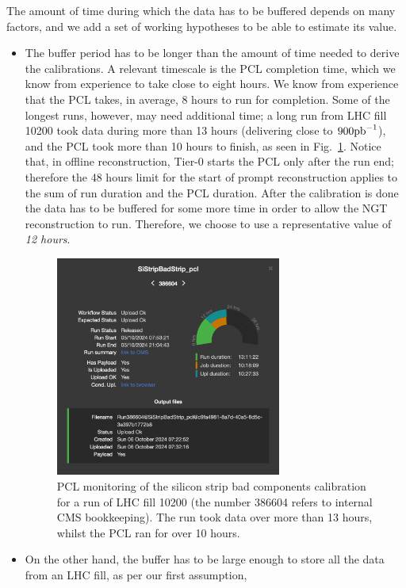 The amount of time during which the data has to be buffered depends on many factors,
and we add a set of working hypotheses to be able to estimate its value.
\begin{itemize}
\item The buffer period has to be longer than the amount of time needed to derive the calibrations.
A relevant timescale is the PCL completion time, which we know from experience to take close to eight hours.
We know from experience that the PCL takes, in average, 8 hours to run for completion.
Some of the longest runs, however, may need additional time; a long run from LHC fill 10200 took data during more than 13 hours
(delivering close to $900\mathrm{pb}^{-1}$), and
the PCL took more than 10 hours to finish,
as seen in Fig.~\ref{fig:fill10200PCL}.
Notice that, in offline reconstruction, Tier-0 starts the PCL only after the run end; 
therefore the 48 hours limit for the start of prompt reconstruction applies to 
the sum of run duration and the PCL duration.
After the calibration is done the data has to be buffered for some more time in order to allow the NGT reconstruction to run.
Therefore, we choose to use a representative value of \emph{12 hours}.
\begin{figure}[htbp]
   \centering
	\includegraphics[width=0.7\textwidth]{figures/fill10200PCL.png}
   \caption{PCL monitoring of the silicon strip bad components calibration for a run of LHC fill 10200 (the number 386604 refers to internal CMS bookkeeping).
   The run took data over more than 13 hours, whilst the PCL ran for over 10 hours.}
   \label{fig:fill10200PCL}
\end{figure}
\item On the other hand, the buffer has to be large enough to store all the data from an LHC fill, as per our first assumption,

\end{itemize}
